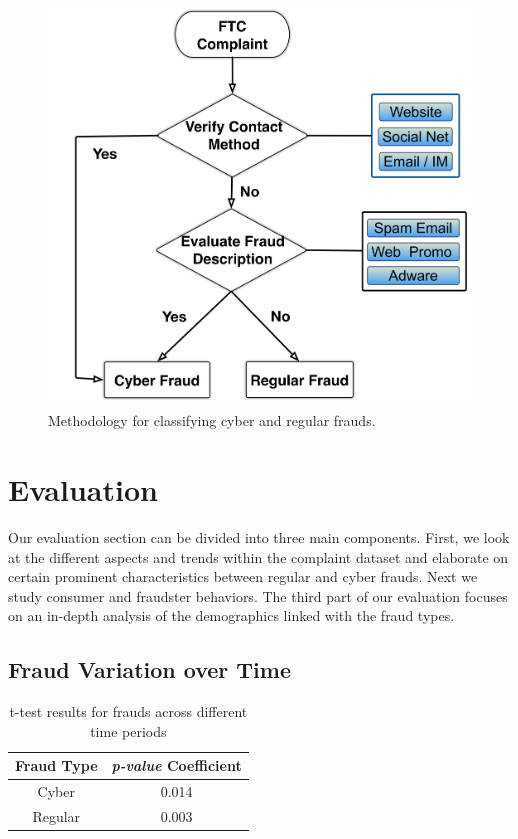 \documentclass[conference]{IEEEtran}
\begin{document}
\begin{figure}[t]
\centering
  \includegraphics[scale=0.28]{graphics/methodology.png}
  \caption{Methodology for classifying cyber and regular frauds.}
  \label{classify}
\end{figure}

\section{Evaluation}\label{eval}

Our evaluation section can be divided into three main components. First, we look at the different aspects and trends within the complaint dataset and elaborate on certain prominent characteristics between regular and cyber frauds. Next we study consumer and fraudster behaviors. The third part of our evaluation focuses on an in-depth analysis of the demographics linked with the fraud types.


\subsection{Fraud Variation over Time}

\begin{table}[b]
\centering
\begin{tabular}{cc}
\hline
\multicolumn{1}{c}{\bfseries Fraud Type} & \multicolumn{1}{c}{\bfseries \emph{p-value}
Coefficient}
\\
\hline
\hline
Cyber & 0.014\\
\hline
Regular & 0.003\\
\hline
\end{tabular}
\vspace{8pt}
\caption{t-test results for frauds across different time periods}\label{ttest}
\vspace{-10pt}
\end{table}
\end{document}
